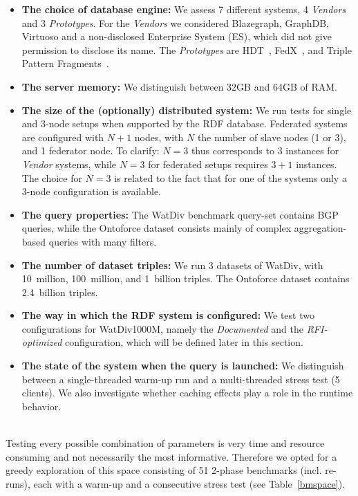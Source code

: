 \begin{itemize}
	\item \textbf{The choice of database engine:} We assess 7 different systems, 4 \emph{Vendors} and 3 \emph{Prototypes}. For the \emph{Vendors} we considered Blazegraph, GraphDB, Virtuoso and a non-disclosed Enterprise System (ES), which did not give permission to disclose its name. The \emph{Prototypes} are HDT~\cite{DBLP:journals/ws/FernandezMGPA13}, FedX~\cite{DBLP:conf/semweb/SchwarteHHSS11}, and Triple Pattern Fragments~\cite{DBLP:conf/semweb/VerborghHMHVSCCMW14}.
	\item \textbf{The server memory:} We distinguish between 32GB and 64GB of RAM.
	\item \textbf{The size of the (optionally) distributed system:} We run tests for single and 3-node setups when supported by the RDF database. Federated systems are configured with $N+1$ nodes, with $N$ the number of slave nodes (1 or 3), and 1 federator node. To clarify: $N=3$ thus corresponds to 3 instances for \emph{Vendor} systems, while $N=3$ for federated setups requires $3+1$ instances. The choice for $N=3$ is related to the fact that for one of the systems only a 3-node configuration is available.
	\item \textbf{The query properties:} The WatDiv benchmark query-set contains BGP queries, while the Ontoforce dataset consists mainly of complex aggregation-based queries with many filters.
	\item \textbf{The number of dataset triples:} We run 3 datasets of WatDiv, with 10~million, 100~million, and 1~billion triples. The Ontoforce dataset contains 2.4~billion triples.
	\item \textbf{The way in which the RDF system is configured:} We test two configurations for WatDiv1000M, namely the \emph{Documented} and the \emph{RFI-optimized} configuration, which will be defined later in this section. 
	\item \textbf{The state of the system when the query is launched:} We distinguish between a single-threaded warm-up run and a multi-threaded stress test (5 clients). We also investigate whether caching effects play a role in the runtime behavior.
\end{itemize} 

\\

Testing every possible combination of parameters is very time and resource consuming and not necessarily the most informative. Therefore we opted for a greedy exploration of this space consisting of 51 2-phase  benchmarks (incl. re-runs), each with a warm-up and a consecutive stress test (see Table~\ref{bmspace}).

